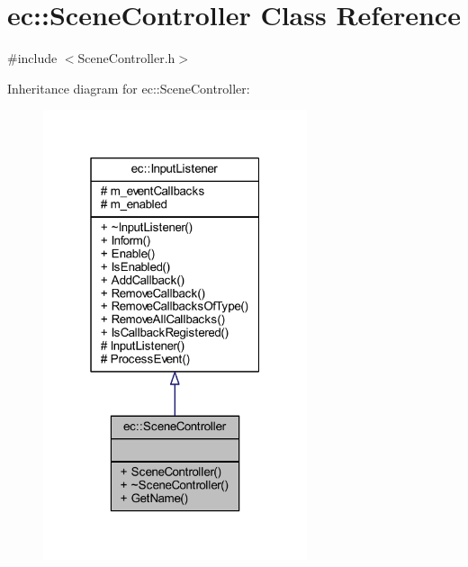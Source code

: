 \hypertarget{classec_1_1_scene_controller}{}\section{ec\+:\+:Scene\+Controller Class Reference}
\label{classec_1_1_scene_controller}


{\ttfamily \#include $<$Scene\+Controller.\+h$>$}



Inheritance diagram for ec\+:\+:Scene\+Controller\+:
\nopagebreak
\begin{figure}[H]
\begin{center}
\leavevmode
\includegraphics[width=220pt]{classec_1_1_scene_controller__inherit__graph}
\end{center}
\end{figure}


